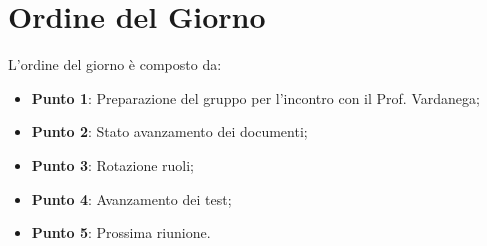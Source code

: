 \section{Ordine del Giorno}
L'ordine del giorno è composto da: 
\begin{itemize}
	\item \textbf{Punto 1}: Preparazione del gruppo per l'incontro con il Prof. Vardanega;
	\item \textbf{Punto 2}: Stato avanzamento dei documenti;
	\item \textbf{Punto 3}: Rotazione ruoli; 
	\item \textbf{Punto 4}: Avanzamento dei test;
	\item \textbf{Punto 5}: Prossima riunione.
\end{itemize}